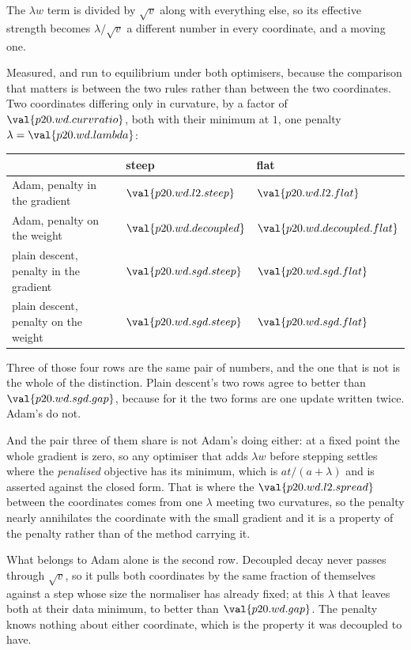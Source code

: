\begin{fr}
\begin{ansblock}
The $\lambda w$ term is divided by $\sqrt{v}$ along with everything else, so
its effective strength becomes $\lambda/\sqrt{v}$ \dash{} a different number in
every coordinate, and a moving one.
\end{ansblock}

Measured, and run to equilibrium under both optimisers, because the comparison
that matters is between the two rules rather than between the two coordinates.
Two coordinates differing only in curvature, by a factor of
$\val{p20.wd.curvratio}$, both with their minimum at $1$, one penalty
$\lambda = \val{p20.wd.lambda}$:

\begin{center}
\begin{tabular}{lll}
\toprule
& steep & flat \\
\midrule
Adam, penalty in the gradient & $\val{p20.wd.l2.steep}$ & $\val{p20.wd.l2.flat}$ \\
Adam, penalty on the weight & $\val{p20.wd.decoupled}$ & $\val{p20.wd.decoupled.flat}$ \\
plain descent, penalty in the gradient & $\val{p20.wd.sgd.steep}$ & $\val{p20.wd.sgd.flat}$ \\
plain descent, penalty on the weight & $\val{p20.wd.sgd.steep}$ & $\val{p20.wd.sgd.flat}$ \\
\bottomrule
\end{tabular}
\end{center}

Three of those four rows are the same pair of numbers, and the one that is not
is the whole of the distinction. Plain descent's two rows agree to better than
$\val{p20.wd.sgd.gap}$, because for it the two forms are one update written
twice. Adam's do not.

And the pair three of them share is not Adam's doing either: at a fixed point
the whole gradient is zero, so any optimiser that adds $\lambda w$ before
stepping settles where the \emph{penalised} objective has its minimum, which
is $at/(a+\lambda)$ and is asserted against the closed form. That is where the
$\val{p20.wd.l2.spread}$ between the coordinates comes from \dash{} one
$\lambda$ meeting two curvatures, so the penalty nearly annihilates the
coordinate with the small gradient \dash{} and it is a property of the penalty
rather than of the method carrying it.

What belongs to Adam alone is the second row. Decoupled
decay%
 never passes
through $\sqrt{v}$, so it pulls both coordinates by the same fraction of
themselves against a step whose size the normaliser has already fixed; at this
$\lambda$ that leaves both at their data minimum, to better than
$\val{p20.wd.gap}$. The penalty knows nothing about either coordinate, which
is the property it was decoupled to have.
\end{fr}

